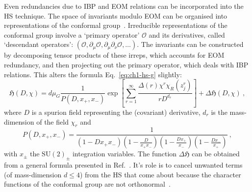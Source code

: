 Even redundancies due to IBP and EOM relations can be incorporated into the HS
technique. The space of invariants modulo EOM can be organised into
representations of the conformal group~\cite{Henning:2017fpj, Henning:2015alf}.
Irreducible representations of the conformal group involve a `primary operator'
$\mathcal{O}$ and its derivatives, called `descendant operators':
$(\mathcal{O}, \partial_{\mu}\mathcal{O}, \partial_{\mu}\partial_{\nu}\mathcal{O}, \ldots)$.
The invariants can be constructed by decomposing tensor products of these
irreps, which accounts for EOM redundancy, and then projecting out the primary
operator, which deals with IBP relations. This alters the formula
Eq.~\eqref{eq:ch1-hs-g} slightly:
\begin{equation}
  \label{eq:ch1-hs-full}
  \mathfrak{H}(D, \chi) = d\mu_{G} \frac{1}{P(D, x_{+}, x_{-})} \exp \left[ \sum_{r=1}^{\infty} \frac{\Delta(r) \chi^{r} \chi_{R}(z_{j}^{r})}{r D^{d_{r}}} \right] + \Delta \mathfrak{H}(D, \chi) \ ,
\end{equation}
where $D$ is a spurion field representing the (covariant) derivative, $d_{r}$ is
the mass-dimension of the field $\chi_{r}$ and
\begin{equation}
  P(D, x_{+}, x_{-}) = \frac{1}{(1-Dx_{+}x_{-})\left(1-\frac{D}{x_{+}x_{-}}\right)\left(1-\frac{Dx_{+}}{x_{-}}\right)\left(1 - \frac{Dx_{-}}{x_{+}}\right)} \ ,
\end{equation}
with $x_{\pm}$ the $\mathrm{SU}(2)_{\pm}$ integration variables. The function
$\Delta \mathfrak{H}$ can be obtained from a general formula presented in
Ref.~\cite{Henning:2017fpj}. It's role is to cancel unwanted terms (of mass-dimension
$d \leq 4$) from the HS that come about because the character functions of the
conformal group are not orthonormal~\cite{Henning:2017fpj}.

